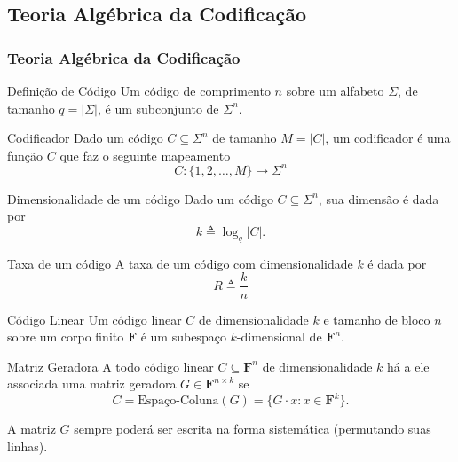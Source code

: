 \subsection{Teoria Algébrica da Codificação}

\begin{frame}[allowframebreaks]
  \frametitle{Teoria Algébrica da Codificação}

  \begin{block}{Definição de Código}
    Um código de comprimento $n$ sobre um alfabeto $\Sigma$, de tamanho $q = \vert \Sigma \vert$, é um subconjunto de $\Sigma^n$.
  \end{block}

  \begin{block}{Codificador}
    Dado um código $C \subseteq \Sigma^n$ de tamanho $M = \vert C \vert$, um codificador é uma função $C$ que faz o seguinte mapeamento
    \begin{equation}
      C: \{1,2,\ldots,M\} \rightarrow \Sigma^n
    \end{equation}
  \end{block}

  \begin{block}{Dimensionalidade de um código}
    Dado um código $C \subseteq \Sigma^n$, sua dimensão é dada por
    \begin{equation}
      k \triangleq \log_q \vert C \vert .
    \end{equation}
  \end{block}

  \begin{block}{Taxa de um código}
    A taxa de um código com dimensionalidade $k$ é dada por
    \begin{equation}
      R \triangleq \frac{k}{n}
    \end{equation}
  \end{block}

  \begin{block}{Código Linear}
  Um código linear $C$ de dimensionalidade $k$ e tamanho de bloco $n$ sobre um corpo finito $\mathbf{F}$
  é um subespaço $k$-dimensional de $\mathbf{F}^n$.
  \end{block}

  \begin{block}{Matriz Geradora}
    A todo código linear $C \subseteq \mathbf{F}^n$ de dimensionalidade $k$ há a ele associada uma matriz geradora
    $G \in \mathbf{F}^{n \times k}$ se 
    \begin{equation} 
      C = \text{Espaço-Coluna}(G) = \{G \cdot x: x \in \mathbf{F}^k\}.
    \end{equation}
  \end{block}
  A matriz $G$ sempre poderá ser escrita na forma sistemática (permutando suas linhas).


\end{frame}
